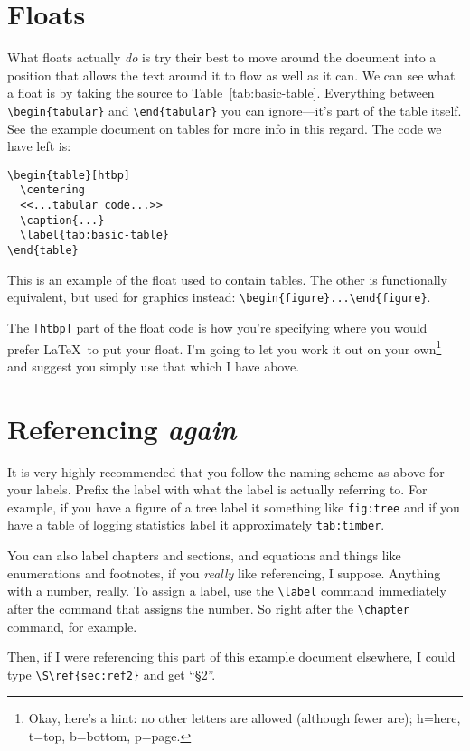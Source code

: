 \documentclass[12pt,article]{memoir}
\begin{document}
\section{Floats}

What floats actually \emph{do} is try their best to move around the document into a position that allows the text around it to flow as well as it can. We can see what a float is by taking the source to Table~\ref{tab:basic-table}. Everything between \verb|\begin{tabular}| and \verb|\end{tabular}| you can ignore---it's part of the table itself. See the example document on tables for more info in this regard. The code we have left is:

\begin{verbatim}
\begin{table}[htbp]
  \centering
  <<...tabular code...>>
  \caption{...}
  \label{tab:basic-table}
\end{table}
\end{verbatim}

This is an example of the float used to contain tables. The other is functionally equivalent, but used for graphics instead: \verb|\begin{figure}...\end{figure}|.

The \verb|[htbp]| part of the float code is how you're specifying where you would prefer \LaTeX\ to put your float. I'm going to let you work it out on your own\footnote{Okay, here's a hint: no other letters are allowed (although fewer are); h=here, t=top, b=bottom, p=page.} and suggest you simply use that which I have above.

\section{Referencing \emph{again}}
\label{sec:ref2}

It is very highly recommended that you follow the naming scheme as above for your labels. Prefix the label with what the label is actually referring to. For example, if you have a figure of a tree label it something like \texttt{fig:tree} and if you have a table of logging statistics label it approximately \texttt{tab:timber}.

You can also label chapters and sections, and equations and things like enumerations and footnotes, if you \emph{really} like referencing, I suppose. Anything with a number, really. To assign a label, use the \verb|\label| command immediately after the command that assigns the number. So right after the \verb|\chapter| command, for example. 

Then, if I were referencing this part of this example document elsewhere, I could type \verb|\S\ref{sec:ref2}| and get ``\S\ref{sec:ref2}''.
\end{document}
